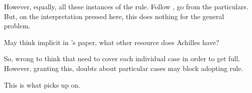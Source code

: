 \begin{note}
  However, equally, all these instances of the rule.
  Follow \textcite{Wisdom:1974uc}, go from the particulars.
  But, on the interpretation pressed here, this does nothing for the general problem.

  May think implicit in \citeauthor{Carroll:1895uj}'s paper, what other resource does Achilles have?
\end{note}


\begin{note}
  So, wrong to think that need to cover each individual case in order to get full.
  However, granting this, doubts about particular cases may block adopting rule.

  This is what \requ{} picks up on.
\end{note}

